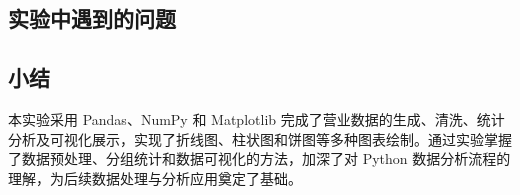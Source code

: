 \documentclass{ctexart}
\begin{document}
\subsection{实验中遇到的问题}
\subsection{小结}
本实验采用 Pandas、NumPy 和 Matplotlib 完成了营业数据的生成、清洗、统计分析及可视化展示，实现了折线图、柱状图和饼图等多种图表绘制。通过实验掌握了数据预处理、分组统计和数据可视化的方法，加深了对 Python 数据分析流程的理解，为后续数据处理与分析应用奠定了基础。
\end{document}
